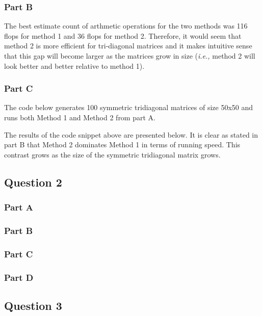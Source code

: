 \subsubsection{Part B}

The best estimate count of arthmetic operations for the two methods was 116 flops for method 1 and 36 flops for method 2.
Therefore, it would seem that method 2 is more efficient for tri-diagonal matrices and it makes intuitive sense that this gap will become larger as the matrices grow in size ({\em i.e.,} method 2 will look better and better relative to method 1).

\newpage
\subsubsection{Part C}

The code below generates 100 symmetric tridiagonal matrices of size 50x50 and runs both Method 1 and Method 2 from part A.


The results of the code snippet above are presented below.
It is clear as stated in part B that Method 2 dominates Method 1 in terms of running speed.
This contrast grows as the size of the symmetric tridiagonal matrix grows.


\newpage
\subsection{Question 2}
\subsubsection{Part A}
\subsubsection{Part B}
\subsubsection{Part C}
\subsubsection{Part D}

\newpage
\subsection{Question 3}
